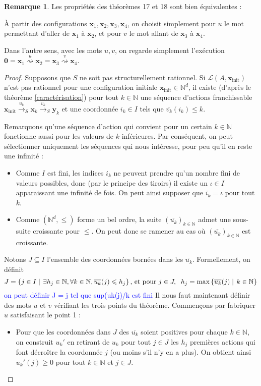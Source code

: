 \documentclass[a4paper,final]{article}
\theoremstyle{definition}
\newtheorem*{Remark}{Remarque}
\let\leq\leqslant
\let\geq\geqslant
\newcommand{\alain}[1]{\textcolor{blue}{#1}}
\newcommand{\set}[2]{\left\{#1\mathrel{\left|\vphantom{#1}\vphantom{#2}\right.}#2\right\}}
\newcommand{\N}{\ensuremath{\mathbb{N}}}
\newcommand{\lang}{\ensuremath{\mathcal{L}}}
\newcommand{\trans}[2]{\ensuremath{\stackrel{#1}{\longrightarrow}_{#2}}}
\newcommand{\transZ}[1]{\ensuremath{\stackrel{#1}{\rightsquigarrow}}}
\newcommand{\vect}[1]{\ensuremath{\mathbf{#1}}}
\newcommand{\xinit}{\ensuremath{\vect{x}_\text{init}}}
\newcommand{\valeur}[1]{\ensuremath{\overline{#1}}}
\begin{document}
\begin{Remark}
Les propriétés des théorèmes 17 et 18 sont bien équivalentes :

\noindent À partir des configurations $\vect{x}_1, \vect{x}_2, \vect{x}_3, \vect{x}_4$, on choisit simplement pour $u$ le mot permettant d'aller de $\vect{x}_1$ à $\vect{x}_2$, et pour $v$ le mot allant de $\vect{x}_3$ à $\vect{x}_4$.

\noindent Dans l'autre sens, avec les mots $u,v$, on regarde simplement l'exécution $\vect{0} = \vect{x}_1 \transZ{u} \vect{x}_2 = \vect{x}_3 \transZ{v} \vect{x}_4$.
\end{Remark}

\begin{proof}
Supposons que $S$ ne soit pas structurellement rationnel.
Si $\lang(A,\xinit)$ n'est pas rationnel pour une configuration initiale $\xinit \in\N^d$, il existe (d'après le théorème \ref{caractérisation}) pour tout $k\in\N$ une séquence d'actions franchissable 
$\xinit \trans{u_k}{S} \vect{x}_k \trans{v_k}{S} \vect{y}_k$
et une coordonnée $i_k \in I$ tels que $\valeur{v_k}(i_k) \leq k$.

Remarquons qu'une séquence d'action qui convient pour un certain $k\in\N$ fonctionne aussi pour les valeurs de $k$ inférieures.
Par conséquent, on peut sélectionner uniquement les séquences qui nous intéresse, pour peu qu'il  en reste une infinité :

\begin{itemize}
    \item Comme $I$ est fini, les indices $i_k$ ne peuvent prendre qu'un nombre fini de valeurs possibles, donc (par le principe des tiroirs) il existe un $\iota\in I$ apparaissant une infinité de fois.
    On peut ainsi supposer que $i_k = \iota$ pour tout $k$.
    
    \item Comme $(\N^d,\leq)$ forme un bel ordre, la suite $(\valeur{u_k})_{k\in\N}$ admet une sous-suite croissante pour $\leq$.
    On peut donc se ramener au cas où $(\valeur{u_k})_{k\in\N}$ est croissante.
\end{itemize}

Notons $J\subseteq I$ l'ensemble des coordonnées bornées dans les $\valeur{u_k}$.
Formellement, on définit 
$$J = \set{j\in I}{\exists h_j\in\N, \forall k\in\N, \valeur{u_k}(j) \leq h_j}
\text{, et pour } j\in J,\hspace{2mm} h_j = \max \set{\valeur{u_k}(j)}{k\in\N}$$
\alain{on peut définir J = j tel que sup{(uk(j)/k} est fini }
Il nous faut maintenant définir des mots $u$ et $v$ vérifiant les trois points du théorème.
Commençons par fabriquer $u$ satisfaisant le point 1 :
\begin{itemize}
    \item Pour que les coordonnées dans $J$ des $\valeur{u_k}$ soient positives pour chaque $k\in\N$, 
    on construit $u_k'$ en retirant de $u_k$ pour tout $j\in J$ les $h_j$ premières actions qui font décroître la coordonnée $j$ (ou moins s'il n'y en a plus).
    On obtient ainsi $\valeur{u_k'}(j) \geq 0$ pour tout $k\in\N$ et $j\in J$.
    

\end{itemize}
\end{proof}
\end{document}

